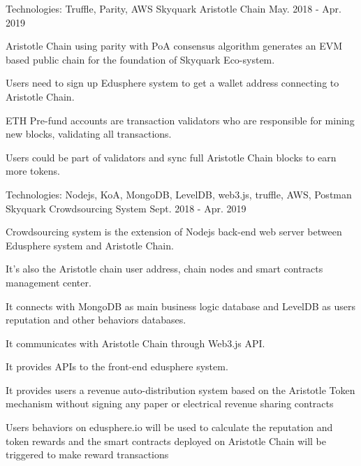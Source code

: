 \begin{cventries}
\cventry
    {Technologies: \quad Truffle, Parity, AWS
    }
    {Skyquark Aristotle Chain}
    {}
    {May. 2018 - Apr. 2019}
    {
      \begin{cvitems}
        \item {Aristotle Chain using parity with PoA consensus algorithm generates an EVM based public chain for the foundation of Skyquark Eco-system.}
        \item {Users need to sign up Edusphere system to get a wallet address connecting to Aristotle Chain.}
        \item {ETH Pre-fund accounts are transaction validators who are responsible for mining new blocks, validating all transactions.}
        \item {Users could be part of validators and sync full Aristotle Chain blocks to earn more tokens.}
      \end{cvitems}
    }
    
\cventry
    {Technologies: \quad Nodejs, KoA, MongoDB, LevelDB, web3.js, truffle, AWS, Postman
    }
    {Skyquark Crowdsourcing System}
    {}
    {Sept. 2018 - Apr. 2019}
    {
      \begin{cvitems}
        \item {Crowdsourcing system is the extension of Nodejs back-end web server between Edusphere system and Aristotle Chain.}
        \item {It's also the Aristotle chain user address, chain nodes and smart contracts   management center.}
        \item {It connects with MongoDB as main business logic database and LevelDB as users reputation and other behaviors databases.}
        \item {It communicates with Aristotle Chain through Web3.js API.}
        \item {It provides APIs to the front-end edusphere system.}
        \item {It provides users a revenue auto-distribution system based on the Aristotle Token mechanism without signing any paper or electrical revenue sharing contracts}
        \item {Users behaviors on edusphere.io will be used to calculate the reputation and token rewards and the smart contracts deployed on Aristotle Chain will be triggered to make reward transactions}
      \end{cvitems}
    }


\end{cventries}
